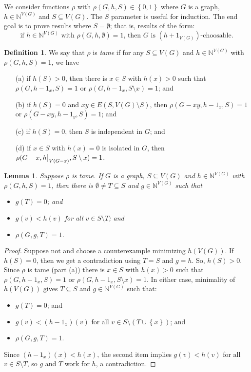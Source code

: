 \documentclass[12pt]{article}
\theoremstyle{plain}
\newtheorem{lem}[thm]{Lemma}
\theoremstyle{definition}
\newtheorem{defn}{Definition}
\theoremstyle{remark}
\newcommand{\IN}{\mathbb{N}}
\newcommand{\set}[1]{\left\{ #1 \right\}}
\newcommand\restr[2]{{%
  \left.\kern-\nulldelimiterspace %
  #1 %
  \vphantom{\big|} %
  \right|_{#2} %
  }}
\begin{document}
We consider functions $\rho$ with $\rho(G,h,S) \in \set{0,1}$ where $G$ is a graph, $h \in \IN^{V(G)}$ and $S \subseteq V(G)$.  The $S$ parameter is useful for induction. The end goal is to prove results where $S=\emptyset$; that is, results of the form:
\[\text{if } h \in \IN^{V(G)} \text{ with } \rho(G, h, \emptyset) = 1\text{, then } G \text{ is } (h + 1_{V(G)})\text{-choosable}.\]
\newpage
\begin{defn}\label{tame}
	We say that $\rho$ is \emph{tame} if for any $S \subseteq V(G)$ and $h \in \IN^{V(G)}$ with $\rho(G, h, S) = 1$, we have
\begin{enumerate}
	\item[(a)] if $h(S) > 0$, then there is $x \in S$ with $h(x) > 0$ such that $\rho(G, h - 1_x, S) = 1$ or $\rho(G, h - 1_x, S \setminus x) = 1$; and
	\item[(b)] if $h(S) = 0$ and $xy \in E(S, V(G)\setminus S)$, then $\rho(G-xy, h - 1_x, S) = 1$ or $\rho(G-xy, h - 1_y, S) = 1$; and
	\item[(c)] if $h(S) = 0$, then $S$ is independent in $G$; and
	\item[(d)] if $x \in S$ with $h(x) = 0$ is isolated in $G$, then $\rho(G - x, \restr{h}{V(G-x)}, S\setminus x) = 1$.
\end{enumerate}
\end{defn}

\begin{lem}\label{GetSuperStable}
	Suppose $\rho$ is tame. If $G$ is a graph, $S \subseteq V(G)$ and $h \in \IN^{V(G)}$ with $\rho(G, h, S) = 1$, then there is $\emptyset \ne T \subseteq S$ and $g \in \IN^{V(G)}$ such that
	\begin{itemize}
		\item $g(T) = 0$; and
		\item $g(v) < h(v)$ for all $v \in S\setminus T$; and
		\item $\rho(G, g, T) = 1$.
	\end{itemize}
\end{lem}
\begin{proof}
	Suppose not and choose a counterexample minimizing $h(V(G))$.  If $h(S) = 0$, then we get a contradiction using $T = S$ and $g=h$.  So, $h(S) > 0$. Since $\rho$ is tame (part (a)) there is $x \in S$ with $h(x) > 0$ such that $\rho(G, h - 1_x, S) = 1$ or $\rho(G, h - 1_x, S \setminus x) = 1$.  In either case, minimality of $h(V(G))$ gives $T \subseteq S$ and $g \in \IN^{V(G)}$ such that:
		\begin{itemize}
			\item $g(T) = 0$; and
			\item $g(v) < (h - 1_x)(v)$ for all $v \in S\setminus (T \cup \set{x})$; and
			\item $\rho(G, g, T) = 1$.
		\end{itemize}
		Since $(h - 1_x)(x) < h(x)$, the second item implies $g(v) < h(v)$ for all $v \in S\setminus T$, so $g$ and $T$ work for $h$, a contradiction.
\end{proof}
\end{document}
